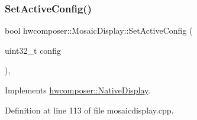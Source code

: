 \subsubsection{\texorpdfstring{Set\+Active\+Config()}{SetActiveConfig()}}
{\footnotesize\ttfamily bool hwcomposer\+::\+Mosaic\+Display\+::\+Set\+Active\+Config (\begin{DoxyParamCaption}\item[{uint32\+\_\+t}]{config }\end{DoxyParamCaption})\hspace{0.3cm}{\ttfamily [override]}, {\ttfamily [virtual]}}



Implements \mbox{\hyperlink{classhwcomposer_1_1NativeDisplay_a63c51853e0d82baf9d6445cf831a5ad1}{hwcomposer\+::\+Native\+Display}}.



Definition at line 113 of file mosaicdisplay.\+cpp.


